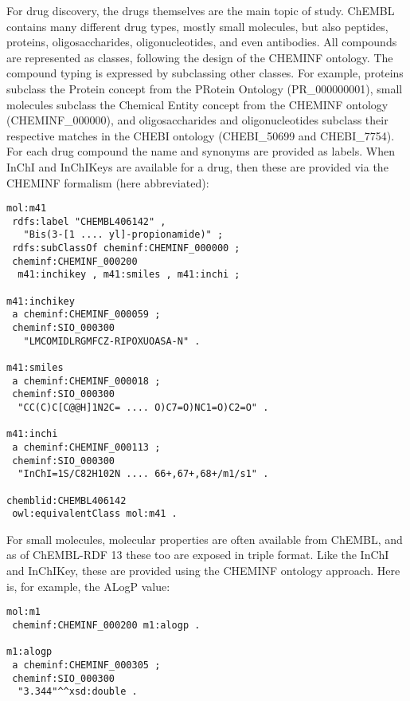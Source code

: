 \documentclass[sw]{iosart2c}
\begin{document}
For drug discovery, the drugs themselves are the main topic of study.
ChEMBL contains many different drug types, mostly small molecules,
but also peptides, proteins, oligosaccharides, oligonucleotides, and
even antibodies. All compounds are represented as classes, following
the design of the CHEMINF ontology. The compound typing is expressed
by subclassing other classes. For example, proteins subclass the
Protein concept from the PRotein Ontology (PR\_000000001), small
molecules subclass the Chemical Entity concept from the CHEMINF
ontology (CHEMINF\_000000), and oligosaccharides and oligonucleotides
subclass their respective matches in the CHEBI ontology (CHEBI\_50699
and CHEBI\_7754). For each drug compound the name and synonyms are
provided as labels. When InChI and InChIKeys are available for a drug, then these are
provided via the CHEMINF formalism (here abbreviated):

\begin{footnotesize}
\begin{verbatim}
mol:m41
 rdfs:label "CHEMBL406142" , 
   "Bis(3-[1 .... yl]-propionamide)" ;
 rdfs:subClassOf cheminf:CHEMINF_000000 ;
 cheminf:CHEMINF_000200
  m41:inchikey , m41:smiles , m41:inchi ;

m41:inchikey
 a cheminf:CHEMINF_000059 ;
 cheminf:SIO_000300
   "LMCOMIDLRGMFCZ-RIPOXUOASA-N" .

m41:smiles
 a cheminf:CHEMINF_000018 ;
 cheminf:SIO_000300
  "CC(C)C[C@@H]1N2C= .... O)C7=O)NC1=O)C2=O" .

m41:inchi
 a cheminf:CHEMINF_000113 ;
 cheminf:SIO_000300
  "InChI=1S/C82H102N .... 66+,67+,68+/m1/s1" .

chemblid:CHEMBL406142
 owl:equivalentClass mol:m41 .
\end{verbatim}
\end{footnotesize}

For small molecules, molecular properties are often available from ChEMBL, and as of ChEMBL-RDF 13
these too are exposed in triple format. Like the InChI and InChIKey, these are provided using the
CHEMINF ontology approach. Here is, for example, the ALogP value:

\begin{footnotesize}
\begin{verbatim}
mol:m1
 cheminf:CHEMINF_000200 m1:alogp .

m1:alogp
 a cheminf:CHEMINF_000305 ;
 cheminf:SIO_000300
  "3.344"^^xsd:double .
\end{verbatim}
\end{footnotesize}
\end{document}
